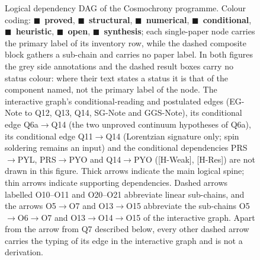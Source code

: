 \documentclass[11pt,a4paper]{article}
\newcommand{\sproved}{\textcolor{cproved}{\textbf{proved}}}
\newcommand{\sstruct}{\textcolor{cstruct}{\textbf{structural}}}
\newcommand{\sheur}{\textcolor{cheur}{\textbf{heuristic}}}
\newcommand{\sopen}{\textcolor{copen}{\textbf{open}}}
\newcommand{\ssynth}{\textcolor{csynth}{\textbf{synthesis}}}
\newcommand{\snum}{\textcolor{cnum}{\textbf{numerical}}}
\newcommand{\scond}{\textcolor{ccond}{\textbf{conditional}}}
\begin{document}
\begin{figure}[p]
{
      }
      \caption[Logical dependency DAG of the Cosmochrony programme.]{\footnotesize Logical dependency DAG of the
        Cosmochrony programme.
      Colour coding: \textcolor{cproved}{$\blacksquare$}~\sproved{},
        \textcolor{cstruct}{$\blacksquare$}~\sstruct{},
        \textcolor{cnum}{$\blacksquare$}~\snum{},
        \textcolor{ccond}{$\blacksquare$}~\scond{},
        \textcolor{cheur}{$\blacksquare$}~\sheur{},
        \textcolor{copen}{$\blacksquare$}~\sopen{},
        \textcolor{csynth}{$\blacksquare$}~\ssynth{}; each single-paper node carries the primary label of its
        inventory row, while the dashed composite block gathers a sub-chain and carries no paper label.
        In both figures the grey side annotations and the dashed result boxes carry no status colour: where their
        text states a status it is that of the component named, not the primary label of the node.
        The interactive graph's conditional-reading and postulated
        edges (EG-Note to Q12, Q13, Q14, SG-Note and GGS-Note), its conditional edge Q6a$\to$Q14
        (the two unproved continuum hypotheses of Q6a), its conditional edge Q11$\to$Q14 (Lorentzian signature
        only; spin soldering remains an input) and the conditional dependencies PRS$\to$PYL, PRS$\to$PYO and
        Q14$\to$PYO ([H-Weak], [H-Res]) are not drawn in this figure.
        Thick arrows indicate the main logical spine; thin arrows indicate supporting dependencies.
        Dashed arrows labelled O10--O11 and O20--O21 abbreviate linear sub-chains, and the arrows O5$\to$O7 and
        O13$\to$O15 abbreviate the sub-chains O5$\to$O6$\to$O7 and O13$\to$O14$\to$O15 of the interactive graph.
        Apart from the arrow from Q7 described below, every other dashed arrow carries the typing of its
        edge in the interactive graph and is not a derivation.
}
\end{figure}
\end{document}
